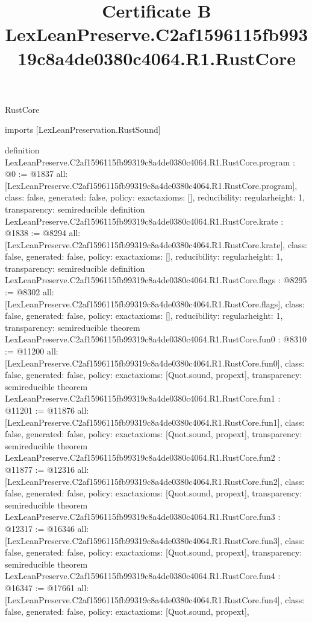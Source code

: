 \begin{lexlean}{RustCore}
\title{Certificate B LexLeanPreserve.C2af1596115fb99319c8a4de0380c4064.R1.RustCore}
\begin{coremodule}
imports [LexLeanPreservation.RustSound]

definition LexLeanPreserve.C2af1596115fb99319c8a4de0380c4064.R1.RustCore.program : @0 := @1837 {
  all: [LexLeanPreserve.C2af1596115fb99319c8a4de0380c4064.R1.RustCore.program],
  class: false,
  generated: false,
  policy: exact{axioms: []},
  reducibility: regular{height: 1},
  transparency: semireducible
}
definition LexLeanPreserve.C2af1596115fb99319c8a4de0380c4064.R1.RustCore.krate : @1838 := @8294 {
  all: [LexLeanPreserve.C2af1596115fb99319c8a4de0380c4064.R1.RustCore.krate],
  class: false,
  generated: false,
  policy: exact{axioms: []},
  reducibility: regular{height: 1},
  transparency: semireducible
}
definition LexLeanPreserve.C2af1596115fb99319c8a4de0380c4064.R1.RustCore.flags : @8295 := @8302 {
  all: [LexLeanPreserve.C2af1596115fb99319c8a4de0380c4064.R1.RustCore.flags],
  class: false,
  generated: false,
  policy: exact{axioms: []},
  reducibility: regular{height: 1},
  transparency: semireducible
}
theorem LexLeanPreserve.C2af1596115fb99319c8a4de0380c4064.R1.RustCore.fun0 : @8310 := @11200 {
  all: [LexLeanPreserve.C2af1596115fb99319c8a4de0380c4064.R1.RustCore.fun0],
  class: false,
  generated: false,
  policy: exact{axioms: [Quot.sound, propext]},
  transparency: semireducible
}
theorem LexLeanPreserve.C2af1596115fb99319c8a4de0380c4064.R1.RustCore.fun1 : @11201 := @11876 {
  all: [LexLeanPreserve.C2af1596115fb99319c8a4de0380c4064.R1.RustCore.fun1],
  class: false,
  generated: false,
  policy: exact{axioms: [Quot.sound, propext]},
  transparency: semireducible
}
theorem LexLeanPreserve.C2af1596115fb99319c8a4de0380c4064.R1.RustCore.fun2 : @11877 := @12316 {
  all: [LexLeanPreserve.C2af1596115fb99319c8a4de0380c4064.R1.RustCore.fun2],
  class: false,
  generated: false,
  policy: exact{axioms: [Quot.sound, propext]},
  transparency: semireducible
}
theorem LexLeanPreserve.C2af1596115fb99319c8a4de0380c4064.R1.RustCore.fun3 : @12317 := @16346 {
  all: [LexLeanPreserve.C2af1596115fb99319c8a4de0380c4064.R1.RustCore.fun3],
  class: false,
  generated: false,
  policy: exact{axioms: [Quot.sound, propext]},
  transparency: semireducible
}
theorem LexLeanPreserve.C2af1596115fb99319c8a4de0380c4064.R1.RustCore.fun4 : @16347 := @17661 {
  all: [LexLeanPreserve.C2af1596115fb99319c8a4de0380c4064.R1.RustCore.fun4],
  class: false,
  generated: false,
  policy: exact{axioms: [Quot.sound, propext]},
}
\end{coremodule}
\end{lexlean}
